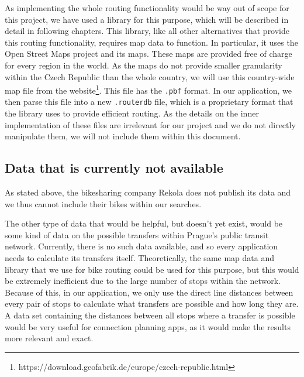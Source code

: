 As implementing the whole routing functionality would be way out of scope for this project, we have used a library for this purpose, which will be described in detail in following chapters. This library, like all other alternatives that provide this routing functionality, requires map data to function. In particular, it uses the Open Street Maps project and its maps. These maps are provided free of charge for every region in the world. As the maps do not provide smaller granularity within the Czech Republic than the whole country, we will use this country-wide map file from the website\footnote{https://download.geofabrik.de/europe/czech-republic.html}. This file has the \texttt{.pbf} format. In our application, we then parse this file into a new \texttt{.routerdb} file, which is a proprietary format that the library uses to provide efficient routing. As the details on the inner implementation of these files are irrelevant for our project and we do not directly manipulate them, we will not include them within this document.

\subsection{Data that is currently not available}

As stated above, the bikesharing company Rekola does not publish its data and we thus cannot include their bikes within our searches.

The other type of data that would be helpful, but doesn't yet exist, would be some kind of data on the possible transfers within Prague's public transit network. Currently, there is no such data available, and so every application needs to calculate its transfers itself. Theoretically, the same map data and library that we use for bike routing could be used for this purpose, but this would be extremely inefficient due to the large number of stops within the network. Because of this, in our application, we only use the direct line distances between every pair of stops to calculate what transfers are possible and how long they are. A data set containing the distances between all stops where a transfer is possible would be very useful for connection planning apps, as it would make the results more relevant and exact.



